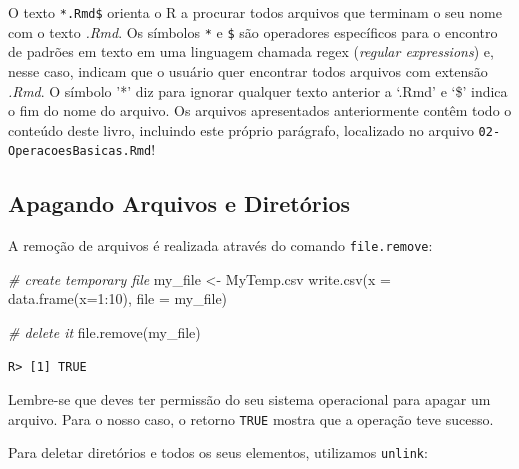 \documentclass[
  11pt,
]{book}
\newenvironment{Shaded}{\begin{snugshade}}{\end{snugshade}}
\newcommand{\AttributeTok}[1]{\textcolor[rgb]{0.61,0.61,0.61}{#1}}
\newcommand{\CommentTok}[1]{\textcolor[rgb]{0.37,0.37,0.37}{\textit{#1}}}
\newcommand{\DecValTok}[1]{\textcolor[rgb]{0.06,0.06,0.06}{#1}}
\newcommand{\FunctionTok}[1]{\textcolor[rgb]{0,0,0}{#1}}
\newcommand{\NormalTok}[1]{#1}
\newcommand{\OtherTok}[1]{\textcolor[rgb]{0.37,0.37,0.37}{#1}}
\newcommand{\SpecialCharTok}[1]{\textcolor[rgb]{0,0,0}{#1}}
\newcommand{\StringTok}[1]{\textcolor[rgb]{0.5,0.5,0.5}{#1}}
\begin{document}
O texto \texttt{*.Rmd\$} orienta o R a procurar todos arquivos que terminam o seu nome com o texto \emph{.Rmd}. Os símbolos \texttt{\textquotesingle{}*\textquotesingle{}\textquotesingle{}} e \texttt{\textquotesingle{}\$\textquotesingle{}} são operadores específicos para o encontro de padrões em texto em uma linguagem chamada regex (\emph{regular expressions}) e, nesse caso, indicam que o usuário quer encontrar todos arquivos com extensão \emph{.Rmd}. O símbolo '*' diz para ignorar qualquer texto anterior a `.Rmd' e `\$' indica o fim do nome do arquivo. Os arquivos apresentados anteriormente contêm todo o conteúdo deste livro, incluindo este próprio parágrafo, localizado no arquivo \texttt{02-OperacoesBasicas.Rmd}!

\hypertarget{apagando-arquivos-e-diretuxf3rios}{%
\subsection{Apagando Arquivos e Diretórios}\label{apagando-arquivos-e-diretuxf3rios}}

A remoção de arquivos é realizada através do comando \texttt{file.remove}:

\begin{Shaded}
\begin{Highlighting}[]
\CommentTok{\# create temporary file}
\NormalTok{my\_file }\OtherTok{\textless{}{-}} \StringTok{\textquotesingle{}MyTemp.csv\textquotesingle{}}
\FunctionTok{write.csv}\NormalTok{(}\AttributeTok{x =} \FunctionTok{data.frame}\NormalTok{(}\AttributeTok{x=}\DecValTok{1}\SpecialCharTok{:}\DecValTok{10}\NormalTok{),}
          \AttributeTok{file =}\NormalTok{ my\_file)}

\CommentTok{\# delete it}
\FunctionTok{file.remove}\NormalTok{(my\_file)}
\end{Highlighting}
\end{Shaded}

\begin{verbatim}
R> [1] TRUE
\end{verbatim}

Lembre-se que deves ter permissão do seu sistema operacional para apagar um arquivo. Para o nosso caso, o retorno \texttt{TRUE} mostra que a operação teve sucesso.

Para deletar diretórios e todos os seus elementos, utilizamos \texttt{unlink}:
\end{document}
